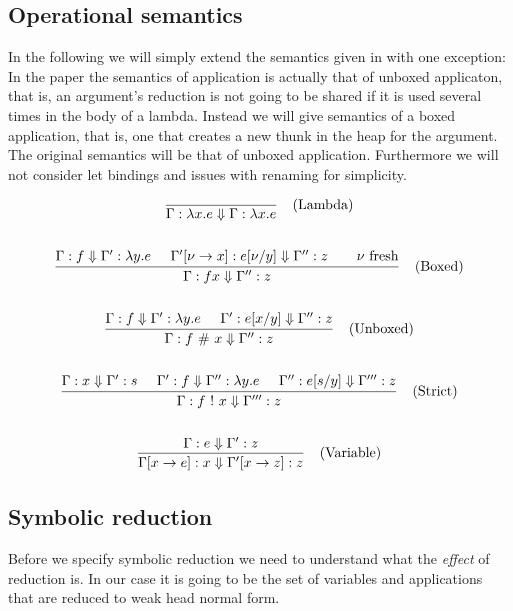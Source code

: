 \documentclass[a4paper]{article}
\begin{document}
\subsection{Operational semantics}

In the following we will simply extend the semantics given in \cite{Launchbury:1993:NSL:158511.158618} with one exception: In the paper the semantics of application is actually that of unboxed applicaton, that is, an argument's reduction is not going to be shared if it is used several times in the body of a lambda. Instead we will give semantics of a boxed application, that is, one that creates a new thunk in the heap for the argument. The original semantics will be that of unboxed application. Furthermore we will not consider let bindings and issues with renaming for simplicity.

\begin{gather*}
  \infer
      [\text{(Lambda)}]
      {\Gamma : \lambda x. e \reduces \Gamma : \lambda x. e}
      {}
      \\
      \\
  \infer
      [\text{(Boxed)}]
      {\Gamma : f x \reduces \Gamma'' : z}
      {\Gamma : f \reduces \Gamma' : \lambda y. e \;\;\;\;\; \Gamma'[\nu \to x] : e[\nu/y] \reduces \Gamma'' : z \;\;\;\;\; \text{$\nu$ fresh}}
      \\
      \\
  \infer
      [\text{(Unboxed)}]
      {\Gamma : f \unboxed x \reduces \Gamma'' : z}
      {\Gamma : f \reduces \Gamma' : \lambda y. e \;\;\;\;\; \Gamma' : e[x/y] \reduces \Gamma'' : z}
      \\
      \\
  \infer
      [\text{(Strict)}]
      {\Gamma : f \strict x \reduces \Gamma''' : z}
      {\Gamma : x \reduces \Gamma' : s \;\;\;\;\; \Gamma' : f \reduces \Gamma'' : \lambda y. e \;\;\;\;\; \Gamma'' : e[s/y] \reduces \Gamma''' : z}
      \\
      \\
  \infer
      [\text{(Variable)}]
      {\Gamma[x \to e] : x \reduces \Gamma'[x \to z] : z}
      {\Gamma : e \reduces \Gamma' : z}
\end{gather*}


\subsection{Symbolic reduction}

Before we specify symbolic reduction we need to understand what the \emph{effect} of reduction is. In our case it is going to be the set of variables and applications that are reduced to weak head normal form.
\end{document}

